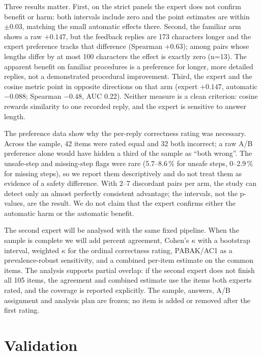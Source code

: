 \documentclass{ieeeaccess}
\begin{document}
Three results matter. First, on the strict panels the expert does not confirm
benefit or harm: both intervals include zero and the point estimates are within $\pm0.03$,
matching the small automatic effects there. Second, the familiar arm shows a raw
$+0.147$, but the feedback replies are 173 characters longer and the expert
preference tracks that difference (Spearman $+0.63$); among pairs whose lengths
differ by at most 100 characters the effect is exactly zero (n=13). The apparent
benefit on familiar procedures is a preference for longer, more detailed replies,
not a demonstrated procedural improvement. Third, the expert and the cosine metric
point in opposite directions on that arm (expert $+0.147$, automatic $-0.088$;
Spearman $-0.48$, AUC 0.22). Neither measure is a clean criterion: cosine rewards
similarity to one recorded reply, and the expert is sensitive to answer length.

The preference data show why the per-reply correctness rating was necessary.
Across the sample, 42 items were rated equal and 32 both incorrect; a raw A/B
preference alone would have hidden a third of the sample as ``both wrong''. The
unsafe-step and missing-step flags were rare (5.7--8.6\,\% for unsafe steps,
0--2.9\,\% for missing steps), so we report them descriptively and do not treat
them as evidence of a safety difference. With 2--7 discordant pairs per arm, the
study can detect only an almost perfectly consistent advantage; the intervals, not
the p-values, are the result. We do not claim that the expert confirms either the
automatic harm or the automatic benefit.

The second expert will be analysed with the same fixed pipeline. When the sample is
complete we will add percent agreement, Cohen's $\kappa$ with a bootstrap interval,
weighted $\kappa$ for the ordinal correctness rating, PABAK/AC1 as a
prevalence-robust sensitivity, and a combined per-item estimate on the common items.
The analysis supports partial overlap: if the second expert does not finish all 105
items, the agreement and combined estimate use the items both experts rated, and
the coverage is reported explicitly. The sample, answers, A/B assignment and
analysis plan are frozen; no item is added or removed after the first rating.


\section{Validation}
\label{sec:validation}
\end{document}

